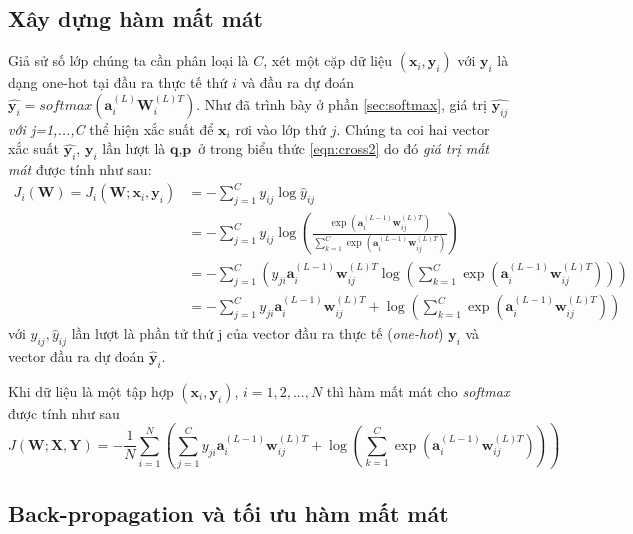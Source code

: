 \subsection{Xây dựng hàm mất mát}
Giả sử số lớp chúng ta cần phân loại là $C$, xét một cặp dữ liệu $(\textbf{x}_i,\textbf{y}_i)$ với $\textbf{y}_i$ là dạng one-hot tại đầu ra thực tế thứ $i$ và đầu ra dự đoán $\widehat{\textbf{y}_i} = softmax(\textbf{a}^{(L)}_i\textbf{W}^{(L)T}_i)$. Như đã trình bày ở phần \ref{sec:softmax}, giá trị $\widehat{\textbf{y}_{ij}}$\textit{ với j=1,...,C} thể hiện xắc suất để $\textbf{x}_i$ rơi vào lớp thứ $j$. Chúng ta coi  hai vector xắc suất $\widehat{\textbf{y}_{i}}$, $\textbf{y}_i$ lần lượt là $\textbf{q},\textbf{p}$ ở trong biểu thức \ref{eqn:cross2} do đó \textit{giá trị mất mát} được tính như sau:
\begin{equation}
\label{eq:cost1}
\begin{split}
J_i(\textbf{W}) = J_i(\textbf{W};\textbf{x}_i,\textbf{y}_i) &=-\sum_{j=1}^C y_{ij} \log \widehat{y}_{ij}	\\
&= -\sum_{j = 1}^C y_{ij}\log\left(\frac{\exp(\textbf{a}^{(L-1)}_i\textbf{w}^{(L)T}_{ij})}{\sum_{k=1}^C \exp(\textbf{a}^{(L-1)}_i\textbf{w}^{(L)T}_{ij})}\right)\\
&= -\sum_{j=1}^C\left(y_{ji} \textbf{a}^{(L-1)}_i\textbf{w}^{(L)T}_{ij}\log\left(\sum_{k=1}^C \exp(\textbf{a}^{(L-1)}_i\textbf{w}^{(L)T}_{ij})\right)\right) \\
&= -\sum_{j=1}^C y_{ji} \textbf{a}^{(L-1)}_i\textbf{w}^{(L)T}_{ij} + \log\left(\sum_{k=1}^C \exp(\textbf{a}^{(L-1)}_i\textbf{w}^{(L)T}_{ij})\right) 
\end{split}
\end{equation}
với  $y_{ij}, \widehat{y}_{ij}$ lần lượt là phần tử thứ j của vector đầu ra thực tế (\textit{one-hot}) $\textbf{y}_i$ và vector đầu ra dự đoán $\widehat{\textbf{y}}_i$. \par

Khi dữ liệu là một tập hợp $(\textbf{x}_i,\textbf{y}_i)$, $i=1,2,...,N$ thì hàm mất mát cho \textit{softmax} được tính như sau
\begin{equation}
\label{eq:cost2}
J(\textbf{W};\textbf{X},\textbf{Y}) = -\frac{1}{N} \sum_{i=1}^N \left(  \sum_{j=1}^C y_{ji} \textbf{a}^{(L-1)}_i\textbf{w}^{(L)T}_{ij} + \log\left(\sum_{k=1}^C \exp(\textbf{a}^{(L-1)}_i\textbf{w}^{(L)T}_{ij})\right) \right)
\end{equation} 


\subsection{Back-propagation và tối ưu hàm mất mát}
